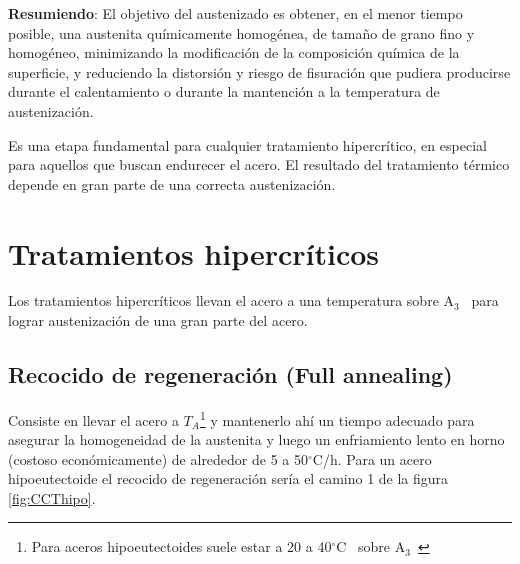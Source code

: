 \documentclass{article}
\newcommand{\Athree}{A\ensuremath{_{3}}}
\newcommand{\grad}{\ensuremath{^\circ \mathrm{C}}}
\begin{document}
{\bf Resumiendo}: El objetivo del austenizado es obtener, en el menor tiempo posible, una austenita químicamente homogénea, de tamaño de grano fino y homogéneo, minimizando la modificación de la composición química de la superficie, y reduciendo la distorsión y riesgo de fisuración que pudiera producirse durante el calentamiento o durante la mantención a la temperatura de austenización. 

Es una etapa fundamental para cualquier tratamiento hipercrítico, en especial para aquellos que buscan endurecer el acero. El resultado del tratamiento térmico depende en gran parte de una correcta austenización.

\section{Tratamientos hipercríticos}
Los tratamientos hipercr\'iticos llevan el acero a una temperatura sobre \Athree~ para lograr austenizaci\'on de una gran parte del acero.
\subsection[Recocido de regeneración]{Recocido de regeneración (Full annealing)}
Consiste en llevar el acero a $T_A$\footnote{Para aceros hipoeutectoides suele estar a 20 a 40\grad~ sobre \Athree~} y mantenerlo ahí un tiempo adecuado para asegurar la homogeneidad de la austenita y luego un enfriamiento lento en horno (costoso económicamente) de alrededor de 5 a 50\grad{}/h. Para un acero hipoeutectoide el recocido de regeneraci\'on ser\'ia el camino 1 de la figura \ref{fig:CCThipo}.
\end{document}
